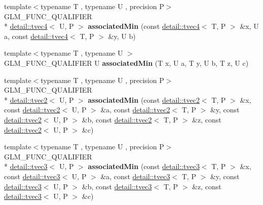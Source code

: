\begin{DoxyCompactItemize}
\item 
\hypertarget{namespaceglm_a5b01b43448d92d25fd2a93ab8bade0ee}{{\footnotesize template$<$typename T , typename U , precision P$>$ }\\G\-L\-M\-\_\-\-F\-U\-N\-C\-\_\-\-Q\-U\-A\-L\-I\-F\-I\-E\-R \\*
\hyperlink{structglm_1_1detail_1_1tvec4}{detail\-::tvec4}$<$ U, P $>$ {\bfseries associated\-Min} (const \hyperlink{structglm_1_1detail_1_1tvec4}{detail\-::tvec4}$<$ T, P $>$ \&x, U a, const \hyperlink{structglm_1_1detail_1_1tvec4}{detail\-::tvec4}$<$ T, P $>$ \&y, U b)}\label{namespaceglm_a5b01b43448d92d25fd2a93ab8bade0ee}

\item 
\hypertarget{namespaceglm_a7a59f677a5e4fc9274bc9ae72cd51c75}{{\footnotesize template$<$typename T , typename U $>$ }\\G\-L\-M\-\_\-\-F\-U\-N\-C\-\_\-\-Q\-U\-A\-L\-I\-F\-I\-E\-R U {\bfseries associated\-Min} (T x, U a, T y, U b, T z, U c)}\label{namespaceglm_a7a59f677a5e4fc9274bc9ae72cd51c75}

\item 
\hypertarget{namespaceglm_aa435fc5c6ffb758dfc2b9628d90da4f5}{{\footnotesize template$<$typename T , typename U , precision P$>$ }\\G\-L\-M\-\_\-\-F\-U\-N\-C\-\_\-\-Q\-U\-A\-L\-I\-F\-I\-E\-R \\*
\hyperlink{structglm_1_1detail_1_1tvec2}{detail\-::tvec2}$<$ U, P $>$ {\bfseries associated\-Min} (const \hyperlink{structglm_1_1detail_1_1tvec2}{detail\-::tvec2}$<$ T, P $>$ \&x, const \hyperlink{structglm_1_1detail_1_1tvec2}{detail\-::tvec2}$<$ U, P $>$ \&a, const \hyperlink{structglm_1_1detail_1_1tvec2}{detail\-::tvec2}$<$ T, P $>$ \&y, const \hyperlink{structglm_1_1detail_1_1tvec2}{detail\-::tvec2}$<$ U, P $>$ \&b, const \hyperlink{structglm_1_1detail_1_1tvec2}{detail\-::tvec2}$<$ T, P $>$ \&z, const \hyperlink{structglm_1_1detail_1_1tvec2}{detail\-::tvec2}$<$ U, P $>$ \&c)}\label{namespaceglm_aa435fc5c6ffb758dfc2b9628d90da4f5}

\item 
\hypertarget{namespaceglm_a71615041a85263b9e375eb82b65e7886}{{\footnotesize template$<$typename T , typename U , precision P$>$ }\\G\-L\-M\-\_\-\-F\-U\-N\-C\-\_\-\-Q\-U\-A\-L\-I\-F\-I\-E\-R \\*
\hyperlink{structglm_1_1detail_1_1tvec3}{detail\-::tvec3}$<$ U, P $>$ {\bfseries associated\-Min} (const \hyperlink{structglm_1_1detail_1_1tvec3}{detail\-::tvec3}$<$ T, P $>$ \&x, const \hyperlink{structglm_1_1detail_1_1tvec3}{detail\-::tvec3}$<$ U, P $>$ \&a, const \hyperlink{structglm_1_1detail_1_1tvec3}{detail\-::tvec3}$<$ T, P $>$ \&y, const \hyperlink{structglm_1_1detail_1_1tvec3}{detail\-::tvec3}$<$ U, P $>$ \&b, const \hyperlink{structglm_1_1detail_1_1tvec3}{detail\-::tvec3}$<$ T, P $>$ \&z, const \hyperlink{structglm_1_1detail_1_1tvec3}{detail\-::tvec3}$<$ U, P $>$ \&c)}\label{namespaceglm_a71615041a85263b9e375eb82b65e7886}


\end{DoxyCompactItemize}
